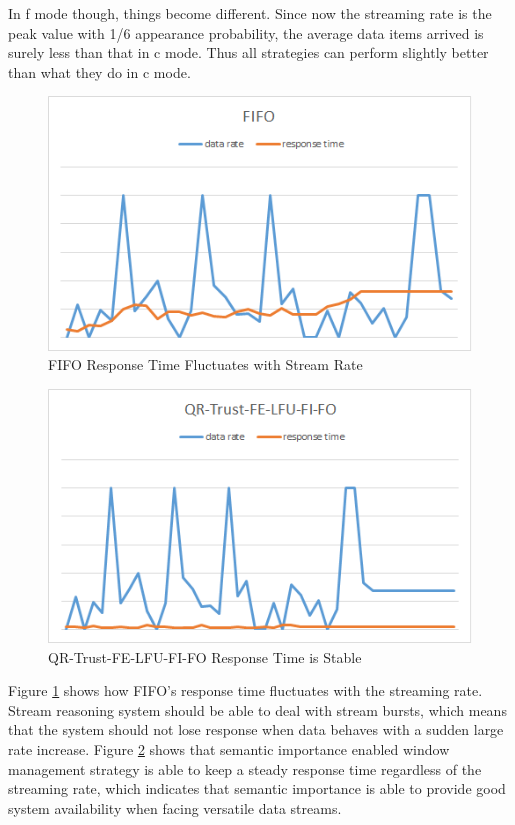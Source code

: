In f mode though, things become different. 
Since now the streaming rate is the peak value with 1/6 appearance probability, the average data items arrived is surely less than that in c mode. 
Thus all strategies can perform slightly better than what they do in c mode. 

\begin{figure}[!htbp]
	\centering
    \includegraphics[width=5in]{img/6-fluctuating.png}
    \caption{FIFO Response Time Fluctuates with Stream Rate}
    \label{fig:6-fluc}
\end{figure}

\begin{figure}[!htbp]
	\centering
    \includegraphics[width=5in]{img/6-flat.png}
    \caption{QR-Trust-FE-LFU-FI-FO Response Time is Stable}
   	\label{fig:6-flat}
\end{figure}

Figure \ref{fig:6-fluc} shows how FIFO's response time fluctuates with the streaming rate.
Stream reasoning system should be able to deal with stream bursts, which means that the system should not lose response when data behaves with a sudden large rate increase. 
Figure \ref{fig:6-flat} shows that semantic importance enabled window management strategy is able to keep a steady response time regardless of the streaming rate, which indicates that semantic importance is able to provide good system availability when facing versatile data streams. 
%
